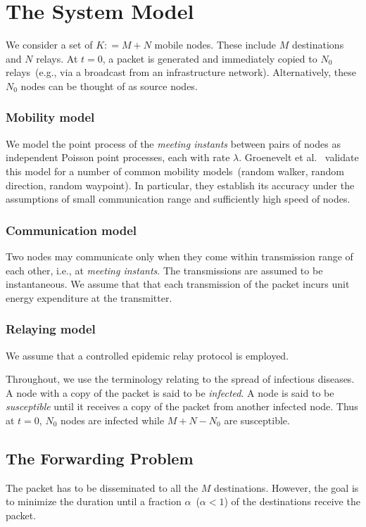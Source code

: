 \documentclass[10pt,journal,letterpaper]{IEEEtran}
\begin{document}
\section{The System Model}
\label{sec:sys-model}
We consider a set of $K: = M+N$ mobile nodes. These include $M$
destinations and $N$ relays. At $t=0$, a packet is generated and
immediately copied to $N_0$ relays~(e.g., via a broadcast from an infrastructure
network). Alternatively, these $N_0$ nodes can be thought of
as source nodes.

\subsubsection{Mobility model}
We model the point process of the {\it meeting instants} between pairs of nodes as independent Poisson point processes, each with rate $\lambda$. Groenevelt et al.~\cite{comnet-dtn.groenevelt-etal05message-delay-mobile-networks} validate this model for a number of common mobility models~(random walker, random direction, random waypoint). In particular, they establish its accuracy under the assumptions of small communication range and sufficiently high speed of nodes.

\subsubsection{Communication model}
Two nodes may communicate only when they come within transmission
range of each other, i.e., at {\it meeting instants}.
The transmissions are assumed to be instantaneous. We assume that
that each transmission of the packet incurs unit energy expenditure
at the transmitter.

\subsubsection{Relaying model}
We assume that a controlled epidemic relay protocol is employed.

Throughout, we use the terminology relating to the spread of
infectious diseases. A node with a copy of the packet is said to be
{\it infected}. A node is said to be {\it susceptible} until it receives a copy
of the packet from another infected node. Thus at $t=0$,  $N_0$
nodes are infected while $M+N-N_0$ are susceptible.

\subsection{The Forwarding Problem}
\label{sec:forward-problem} The packet has to be disseminated to all
the $M$ destinations. However, the goal is to minimize the duration
until a fraction $\alpha$~($\alpha < 1$) of the
destinations receive the packet.
\end{document}
